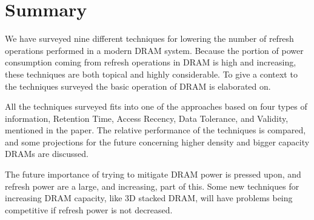 \section{Summary} 
\label{sec:sum}
We have surveyed nine different techniques for lowering the number of refresh operations performed in a modern DRAM system. Because the portion of power consumption coming from refresh operations in DRAM is high and increasing, these techniques are both topical and highly considerable. To give a context to the techniques surveyed the basic operation of DRAM is elaborated on. 

All the techniques surveyed fits into one of the approaches based on four types of information, Retention Time, Access Recency, Data Tolerance, and Validity, mentioned in the paper. The relative performance of the techniques is compared, and some projections for the future concerning higher density and bigger capacity DRAMs are discussed.

The future importance of trying to mitigate DRAM power is pressed upon, and refresh power are a large, and increasing, part of this. Some new techniques for increasing DRAM capacity, like 3D stacked DRAM, will have problems being competitive if refresh power is not decreased.   